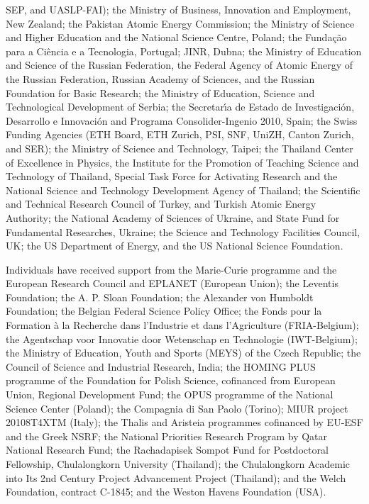 {{{SEP, and UASLP-FAI); the Ministry of Business, Innovation and
Employment, New Zealand; the Pakistan Atomic Energy Commission; the
Ministry of Science and Higher Education and the National Science
Centre, Poland; the Funda\c{c}\~ao para a Ci\^encia e a Tecnologia,
Portugal; JINR, Dubna; the Ministry of Education and Science of the
Russian Federation, the Federal Agency of Atomic Energy of the Russian
Federation, Russian Academy of Sciences, and the Russian Foundation
for Basic Research; the Ministry of Education, Science and
Technological Development of Serbia; the Secretar\'{\i}a de Estado de
Investigaci\'on, Desarrollo e Innovaci\'on and Programa
Consolider-Ingenio 2010, Spain; the Swiss Funding Agencies (ETH Board,
ETH Zurich, PSI, SNF, UniZH, Canton Zurich, and SER); the Ministry of
Science and Technology, Taipei; the Thailand Center of Excellence in
Physics, the Institute for the Promotion of Teaching Science and
Technology of Thailand, Special Task Force for Activating Research and
the National Science and Technology Development Agency of Thailand;
the Scientific and Technical Research Council of Turkey, and Turkish
Atomic Energy Authority; the National Academy of Sciences of Ukraine,
and State Fund for Fundamental Researches, Ukraine; the Science and
Technology Facilities Council, UK; the US Department of Energy, and
the US National Science Foundation.

Individuals have received support from the Marie-Curie programme and the European Research Council and EPLANET (European Union); the Leventis Foundation; the A. P. Sloan Foundation; the Alexander von Humboldt Foundation; the Belgian Federal Science Policy Office; the Fonds pour la Formation \`a la Recherche dans l'Industrie et dans l'Agriculture (FRIA-Belgium); the Agentschap voor Innovatie door Wetenschap en Technologie (IWT-Belgium); the Ministry of Education, Youth and Sports (MEYS) of the Czech Republic; the Council of Science and Industrial Research, India; the HOMING PLUS programme of the Foundation for Polish Science, cofinanced from European Union, Regional Development Fund; the OPUS programme of the National Science Center (Poland); the Compagnia di San Paolo (Torino); MIUR project 20108T4XTM (Italy); the Thalis and Aristeia programmes cofinanced by EU-ESF and the Greek NSRF; the National Priorities Research Program by Qatar National Research Fund; the Rachadapisek Sompot Fund for Postdoctoral Fellowship, Chulalongkorn University (Thailand); the Chulalongkorn Academic into Its 2nd Century Project Advancement Project (Thailand); and the Welch Foundation, contract C-1845; and  the Weston Havens Foundation (USA).
\appendix 

}}}
